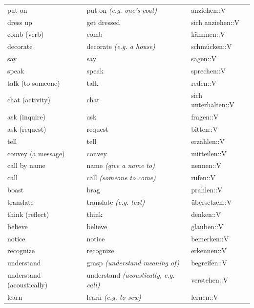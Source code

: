 \begin{center}
\begin{longtable}{lll}
{\sc \lowercase{	PUT ON	}}	&	put on	\textit{\footnotesize (e.g. one's coat)}	&	anziehen::V	\\
{\sc \lowercase{	DRESS UP	}}	&	get dressed		&	sich anziehen::V	\\
{\sc \lowercase{	COMB \footnotesize (VERB)	}}	&	comb		&	kämmen::V	\\
{\sc \lowercase{	DECORATE	}}	&	decorate	\textit{\footnotesize (e.g. a house)}	&	schmücken::V	\\
{\sc \lowercase{	SAY	}}	&	say		&	sagen::V	\\
{\sc \lowercase{	SPEAK	}}	&	speak		&	sprechen::V	\\
{\sc \lowercase{	TALK \footnotesize (TO SOMEONE)	}}	&	talk		&	reden::V	\\
{\sc \lowercase{	CHAT \footnotesize (ACTIVITY)	}}	&	chat		&	sich unterhalten::V	\\
{\sc \lowercase{	ASK \footnotesize (INQUIRE)	}}	&	ask		&	fragen::V	\\
{\sc \lowercase{	ASK \footnotesize (REQUEST)	}}	&	request		&	bitten::V	\\
{\sc \lowercase{	TELL	}}	&	tell		&	erzählen::V	\\
{\sc \lowercase{	CONVEY \footnotesize (A MESSAGE)	}}	&	convey		&	mitteilen::V	\\
{\sc \lowercase{	CALL BY NAME	}}	&	name	\textit{\footnotesize (give a name to)}	&	nennen::V	\\
{\sc \lowercase{	CALL	}}	&	call	\textit{\footnotesize (someone to come)}	&	rufen::V	\\
{\sc \lowercase{	BOAST	}}	&	brag		&	prahlen::V	\\
{\sc \lowercase{	TRANSLATE	}}	&	translate	\textit{\footnotesize (e.g. text)}	&	übersetzen::V	\\
{\sc \lowercase{	THINK \footnotesize (REFLECT)	}}	&	think		&	denken::V	\\
{\sc \lowercase{	BELIEVE	}}	&	believe		&	glauben::V	\\
{\sc \lowercase{	NOTICE	}}	&	notice		&	bemerken::V	\\
{\sc \lowercase{	RECOGNIZE	}}	&	recognize		&	erkennen::V	\\
{\sc \lowercase{	UNDERSTAND	}}	&	grasp	\textit{\footnotesize (understand meaning of)}	&	begreifen::V	\\
{\sc \lowercase{	\footnotesize UNDERSTAND \footnotesize (ACOUSTICALLY)	}}	&	understand	\textit{\footnotesize (acoustically, e.g. call)}	&	verstehen::V	\\
{\sc \lowercase{	LEARN	}}	&	learn	\textit{\footnotesize (e.g. to sew)}	&	lernen::V	\\

\end{longtable}
\end{center}
